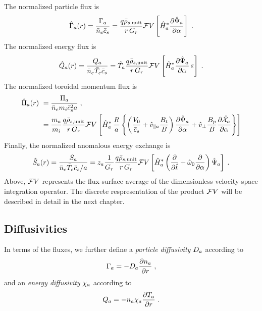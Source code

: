 The normalized particle flux is
%
\begin{equation}
\hat{\Gamma}_a(r) 
= \frac{\Gamma_a}{\bar{n}_e \bar{c}_s} 
= \frac{q \bar{\rho}_{s,{\rm unit}}}{r \, G_r} {\cal F}V \left[ 
   \hat{H}^*_a \frac{\partial\hat{\Psi}_a}{\partial\alpha}\right] \; .
\end{equation}
%
The normalized energy flux is
%
\begin{equation}
\hat{Q}_a(r) = \frac{Q_a}{\bar{n}_e \bar{T}_e \bar{c}_s} 
=  \hat{T}_a \frac{q \bar{\rho}_{s,{\rm unit}}}{r \, G_r} {\cal F}V \left[ 
   \hat{H}^*_a \frac{\partial\hat{\Psi}_a}{\partial\alpha} \, {\varepsilon} \right] \; .
\end{equation}
%
The normalized toroidal momentum flux is
%
\begin{align}
\hat{\Pi}_a(r) &~= \frac{\Pi_a}{\bar{n}_e m_i \bar{c}_s^2 a} \; , \\
 &~= \frac{m_a}{m_i} \frac{q \bar{\rho}_{s,{\rm unit}}}{r\, G_r} {\cal F}V \left[ 
    \hat{H}^*_a \, \frac{R}{a} \left\{
  \left( \frac{V_0}{\bar{c}_s} + \hat{v}_{\parallel a} \frac{B_t}{B} \right)
  \frac{\partial\hat{\Psi}_a}{\partial\alpha} 
  + \hat{v}_\perp \frac{B_p}{B} \frac{\partial\hat{\mathcal{X}}_a}{\partial\alpha}
\right\} \right]  
\end{align}
%
Finally, the normalized anomalous energy exchange is
%
\begin{equation}
\hat{S}_a(r) = \frac{S_a}{\bar{n}_e \bar{T}_e \bar{c}_s/a} 
=  z_a \frac{1}{G_r} \frac{q \bar{\rho}_{s,{\rm unit}}}{r\, G_r} {\cal F}V \left[ 
   \hat{H}^*_a \left( \frac{\partial}{\partial\hat{t}} + 
   \hat{\omega}_0 \frac{\partial}{\partial\alpha} \right)
   \hat{\Psi}_a \right] \; .
\end{equation}
%
Above, ${\cal F}V$ represents the flux-surface average of the  
dimensionless velocity-space integration operator.  The discrete 
respresentation of the product ${\cal F}V$ will be described in 
detail in the next chapter.

\subsection{Diffusivities}

In terms of the fluxes, we further define a {\it particle 
diffusivity} $D_a$ according to 
%
\begin{equation}
\Gamma_a = - D_a \frac{\partial n_a}{\partial r} \; ,
\end{equation}
%
and an {\it energy diffusivity} $\chi_a$ according to
%
\begin{equation}
Q_a = - n_a \chi_a \frac{\partial T_a}{\partial r} \; .
\end{equation}

